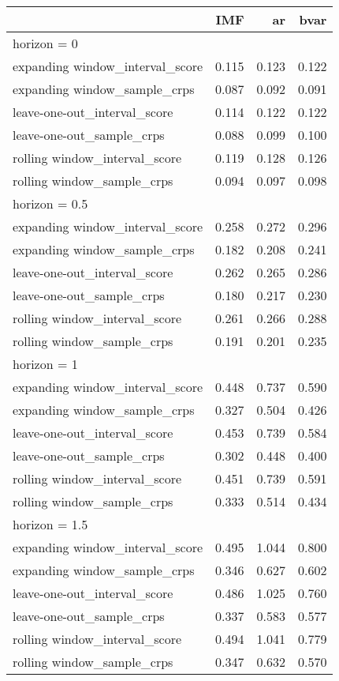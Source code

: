 \documentclass[
]{article}
\begin{document}
\begin{longtable}{l|rrr}
\toprule
\multicolumn{1}{l}{} & IMF & ar & bvar \\ 
\midrule
\multicolumn{4}{l}{horizon = 0} \\ 
\midrule
expanding window\_interval\_score & 0.115 & 0.123 & 0.122 \\ 
expanding window\_sample\_crps & 0.087 & 0.092 & 0.091 \\ 
leave-one-out\_interval\_score & 0.114 & 0.122 & 0.122 \\ 
leave-one-out\_sample\_crps & 0.088 & 0.099 & 0.100 \\ 
rolling window\_interval\_score & 0.119 & 0.128 & 0.126 \\ 
rolling window\_sample\_crps & 0.094 & 0.097 & 0.098 \\ 
\midrule
\multicolumn{4}{l}{horizon = 0.5} \\ 
\midrule
expanding window\_interval\_score & 0.258 & 0.272 & 0.296 \\ 
expanding window\_sample\_crps & 0.182 & 0.208 & 0.241 \\ 
leave-one-out\_interval\_score & 0.262 & 0.265 & 0.286 \\ 
leave-one-out\_sample\_crps & 0.180 & 0.217 & 0.230 \\ 
rolling window\_interval\_score & 0.261 & 0.266 & 0.288 \\ 
rolling window\_sample\_crps & 0.191 & 0.201 & 0.235 \\ 
\midrule
\multicolumn{4}{l}{horizon = 1} \\ 
\midrule
expanding window\_interval\_score & 0.448 & 0.737 & 0.590 \\ 
expanding window\_sample\_crps & 0.327 & 0.504 & 0.426 \\ 
leave-one-out\_interval\_score & 0.453 & 0.739 & 0.584 \\ 
leave-one-out\_sample\_crps & 0.302 & 0.448 & 0.400 \\ 
rolling window\_interval\_score & 0.451 & 0.739 & 0.591 \\ 
rolling window\_sample\_crps & 0.333 & 0.514 & 0.434 \\ 
\midrule
\multicolumn{4}{l}{horizon = 1.5} \\ 
\midrule
expanding window\_interval\_score & 0.495 & 1.044 & 0.800 \\ 
expanding window\_sample\_crps & 0.346 & 0.627 & 0.602 \\ 
leave-one-out\_interval\_score & 0.486 & 1.025 & 0.760 \\ 
leave-one-out\_sample\_crps & 0.337 & 0.583 & 0.577 \\ 
rolling window\_interval\_score & 0.494 & 1.041 & 0.779 \\ 
rolling window\_sample\_crps & 0.347 & 0.632 & 0.570 \\ 
\bottomrule
\end{longtable}
\end{document}
